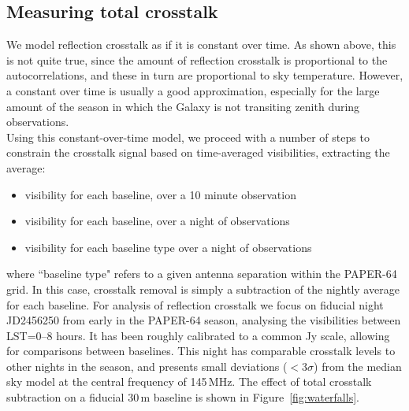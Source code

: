 \documentclass[10pt,a4paper,notitlepage]{article}
\begin{document}
\subsection{Measuring total crosstalk}
\label{subsec:method_xtalk}
We model reflection crosstalk as if it is constant over time. As shown above, this is not quite true, since the amount of reflection crosstalk is proportional to the autocorrelations, and these in turn are proportional to sky temperature. However, a constant over time is usually a good approximation, especially for the large amount of the season in which the Galaxy is not transiting zenith during observations.\\

Using this constant-over-time model, we proceed with a number of steps to constrain the crosstalk signal based on time-averaged visibilities, extracting the average:
\begin{itemize}
\item  visibility for each baseline, over a 10 minute observation
\item  visibility for each baseline, over a night of observations
\item  visibility for each baseline type over a night of observations
\end{itemize}
\noindent where ``baseline type" refers to a given antenna separation within the PAPER-64 grid. In this case, crosstalk removal is simply a subtraction of the nightly average for each baseline. For analysis of reflection crosstalk we focus on fiducial night JD2456250 from early in the PAPER-64 season, analysing the visibilities between LST=0--8 hours. It has been roughly calibrated to a common Jy scale, allowing for comparisons between baselines. This night has comparable crosstalk levels to other nights in the season, and presents small deviations ($<3\sigma$) from the median sky model at the central frequency of 145\,MHz. The effect of total crosstalk subtraction on a fiducial 30\,m baseline is shown in Figure~\ref{fig:waterfalls}.
\end{document}
